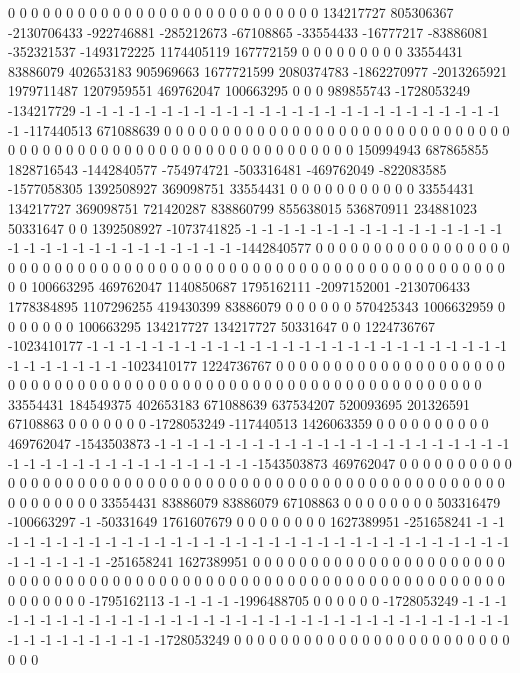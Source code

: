 0 0 0 0 0 0 0 0 0 0 0 0 0 0 0 0 0 0 0 0 0 0 0 0 0 0 0 134217727 805306367 -2130706433 -922746881 -285212673 -67108865 -33554433 -16777217 -83886081 -352321537 -1493172225 1174405119 167772159 0 0 0 0 0 0 0 0 0 33554431 83886079 402653183 905969663 1677721599 2080374783 -1862270977 -2013265921 1979711487 1207959551 469762047 100663295 0 0 0 989855743 -1728053249 -134217729 -1 -1 -1 -1 -1 -1 -1 -1 -1 -1 -1 -1 -1 -1 -1 -1 -1 -1 -1 -1 -1 -1 -1 -1 -1 -1 -1 -117440513 671088639 0 0 0 0 0 0 0 0 0 0 0 0 0 0 0 0 0 0 0 0 0 0 0 0 0 0 0 0 0 0 0 0
0 0 0 0 0 0 0 0 0 0 0 0 0 0 0 0 0 0 0 0 0 0 0 0 0 0 0 0 150994943 687865855 1828716543 -1442840577 -754974721 -503316481 -469762049 -822083585 -1577058305 1392508927 369098751 33554431 0 0 0 0 0 0 0 0 0 0 0 33554431 134217727 369098751 721420287 838860799 855638015 536870911 234881023 50331647 0 0 1392508927 -1073741825 -1 -1 -1 -1 -1 -1 -1 -1 -1 -1 -1 -1 -1 -1 -1 -1 -1 -1 -1 -1 -1 -1 -1 -1 -1 -1 -1 -1 -1 -1 -1442840577 0 0 0 0 0 0 0 0 0 0 0 0 0 0 0 0 0 0 0 0 0 0 0 0 0 0 0 0 0 0 0 0 0
0 0 0 0 0 0 0 0 0 0 0 0 0 0 0 0 0 0 0 0 0 0 0 0 0 0 0 0 0 100663295 469762047 1140850687 1795162111 -2097152001 -2130706433 1778384895 1107296255 419430399 83886079 0 0 0 0 0 0 570425343 1006632959 0 0 0 0 0 0 0 100663295 134217727 134217727 50331647 0 0 1224736767 -1023410177 -1 -1 -1 -1 -1 -1 -1 -1 -1 -1 -1 -1 -1 -1 -1 -1 -1 -1 -1 -1 -1 -1 -1 -1 -1 -1 -1 -1 -1 -1 -1 -1 -1 -1023410177 1224736767 0 0 0 0 0 0 0 0 0 0 0 0 0 0 0 0 0 0 0 0 0 0 0 0 0 0 0 0 0 0 0
0 0 0 0 0 0 0 0 0 0 0 0 0 0 0 0 0 0 0 0 0 0 0 0 0 0 0 0 0 0 33554431 184549375 402653183 671088639 637534207 520093695 201326591 67108863 0 0 0 0 0 0 0 -1728053249 -117440513 1426063359 0 0 0 0 0 0 0 0 0 0 469762047 -1543503873 -1 -1 -1 -1 -1 -1 -1 -1 -1 -1 -1 -1 -1 -1 -1 -1 -1 -1 -1 -1 -1 -1 -1 -1 -1 -1 -1 -1 -1 -1 -1 -1 -1 -1 -1 -1 -1 -1543503873 469762047 0 0 0 0 0 0 0 0 0 0 0 0 0 0 0 0 0 0 0 0 0 0 0 0 0 0 0 0 0
0 0 0 0 0 0 0 0 0 0 0 0 0 0 0 0 0 0 0 0 0 0 0 0 0 0 0 0 0 0 0 0 33554431 83886079 83886079 67108863 0 0 0 0 0 0 0 0 503316479 -100663297 -1 -50331649 1761607679 0 0 0 0 0 0 0 0 1627389951 -251658241 -1 -1 -1 -1 -1 -1 -1 -1 -1 -1 -1 -1 -1 -1 -1 -1 -1 -1 -1 -1 -1 -1 -1 -1 -1 -1 -1 -1 -1 -1 -1 -1 -1 -1 -1 -1 -1 -1 -1 -251658241 1627389951 0 0 0 0 0 0 0 0 0 0 0 0 0 0 0 0 0 0 0 0 0 0 0 0 0 0 0 0
0 0 0 0 0 0 0 0 0 0 0 0 0 0 0 0 0 0 0 0 0 0 0 0 0 0 0 0 0 0 0 0 0 0 0 0 0 0 0 0 0 0 0 0 -1795162113 -1 -1 -1 -1 -1996488705 0 0 0 0 0 0 -1728053249 -1 -1 -1 -1 -1 -1 -1 -1 -1 -1 -1 -1 -1 -1 -1 -1 -1 -1 -1 -1 -1 -1 -1 -1 -1 -1 -1 -1 -1 -1 -1 -1 -1 -1 -1 -1 -1 -1 -1 -1 -1 -1 -1 -1728053249 0 0 0 0 0 0 0 0 0 0 0 0 0 0 0 0 0 0 0 0 0 0 0 0 0 0 0
